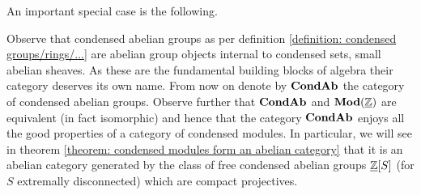 An important special case is the following.
\begin{definition}
	Observe that condensed abelian groups as per definition \ref{definition: condensed groups/rings/...} are abelian group objects internal to condensed sets, \ie small abelian sheaves. As these are the fundamental building blocks of algebra their category deserves its own name. From now on denote by ${{{\mathbf{Cond}}}{{\mathbf{Ab}}}}$ the category of condensed abelian groups. Observe further that ${{{\mathbf{Cond}}}{{\mathbf{Ab}}}}$ and ${{\mathbf{Mod}}(\underline{{\mathbb{Z}}})}$ are equivalent (in fact isomorphic) and hence that the category ${{{\mathbf{Cond}}}{{\mathbf{Ab}}}}$ enjoys all the good properties of a category of condensed modules. In particular, we will see in theorem \ref{theorem: condensed modules form an abelian category} that it is an abelian category generated by the class of free condensed abelian groups ${\underline{{\mathbb{Z}}}[S]}$ (for $S$ extremally disconnected) which are compact projectives.
\end{definition}

%	
%		

